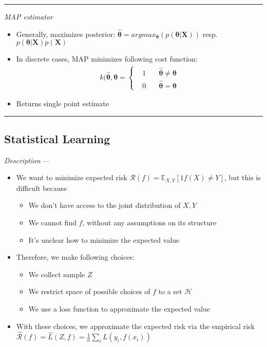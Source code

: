 {\color{lightgray}\hrule height 0.001mm}

\emph{MAP estimator}
\begin{itemize}
    \item Generally, maximizes posterior: $\hat{\boldsymbol{\theta}} = argmax_{\boldsymbol{\theta}}( p(\boldsymbol{\theta}|\boldsymbol{X}) )$ resp. $p(\boldsymbol{\theta}|\boldsymbol{X}) p(\boldsymbol{X})$ 
    \item In discrete cases, MAP minimizes following cost function: 
    \begin{align*}
        k(\hat{\boldsymbol{\theta}},\boldsymbol{\theta}  = 
        \left\{
            \begin{aligned}
                 & 1 \quad & \hat{\boldsymbol{\theta}} \neq \boldsymbol{\theta} \\
                 & 0 \quad & \hat{\boldsymbol{\theta}} = \boldsymbol{\theta}
            \end{aligned}
        \right.
    \end{align*}
    \item Returns single point estimate
\end{itemize}

{\color{black}\hrule height 0.001mm}

\subsection*{Statistical Learning}
\emph{Description} --- 
\begin{itemize}
    \item We want to minimize expected risk $\mathcal{R}(f) = \mathbb{E}_{X,Y}[1{f(X) \neq Y}]$, but this is difficult because
    \begin{itemize}
        \item We don't have access to the joint distribution of $X,Y$
        \item We cannot find $f$, without any assumptions on its structure
        \item It's unclear how to minimize the expected value
    \end{itemize}
    \item Therefore, we make following choices:
    \begin{itemize}
        \item We collect sample $Z$
        \item We restrict space of possible choices of $f$ to a set $\mathcal{H}$
        \item We use a loss function to approximate the expected value
    \end{itemize}
    \item With these choices, we approximate the expected risk via the empirical risk $\hat{\mathcal{R}}(f) = \hat{L}(Z,f) = \frac{1}{n} \sum_i L(y_i, f(x_i))$
\end{itemize}

